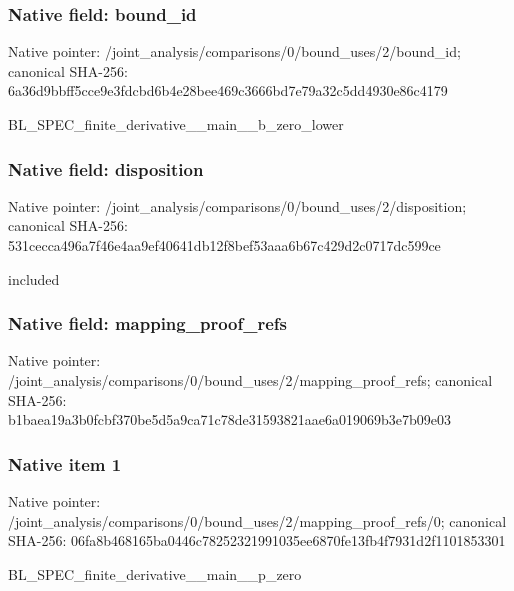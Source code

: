 \documentclass[10pt,a4paper]{article}
\begin{document}
\subsubsection{Native field: bound\_\allowbreak{}id}
Native pointer: /joint\_\allowbreak{}analysis/comparisons/0/bound\_\allowbreak{}uses/2/bound\_\allowbreak{}id; canonical SHA-256: 6a36d9bbff5cce9e3fdcbd6b4e28bee469c3666bd7e79a32c5dd4930e86c4179

\begingroup\raggedright\sloppy BL\_\allowbreak{}SPEC\_\allowbreak{}finite\_\allowbreak{}derivative\_\allowbreak{}\_\allowbreak{}main\_\allowbreak{}\_\allowbreak{}b\_\allowbreak{}zero\_\allowbreak{}lower\par\endgroup

\subsubsection{Native field: disposition}
Native pointer: /joint\_\allowbreak{}analysis/comparisons/0/bound\_\allowbreak{}uses/2/disposition; canonical SHA-256: 531cecca496a7f46e4aa9ef40641db12f8bef53aaa6b67c429d2c0717dc599ce

\begingroup\raggedright\sloppy included\par\endgroup

\subsubsection{Native field: mapping\_\allowbreak{}proof\_\allowbreak{}refs}
Native pointer: /joint\_\allowbreak{}analysis/comparisons/0/bound\_\allowbreak{}uses/2/mapping\_\allowbreak{}proof\_\allowbreak{}refs; canonical SHA-256: b1baea19a3b0fcbf370be5d5a9ca71c78de31593821aae6a019069b3e7b09e03

\subsubsection{Native item 1}
Native pointer: /joint\_\allowbreak{}analysis/comparisons/0/bound\_\allowbreak{}uses/2/mapping\_\allowbreak{}proof\_\allowbreak{}refs/0; canonical SHA-256: 06fa8b468165ba0446c78252321991035ee6870fe13fb4f7931d2f1101853301

\begingroup\raggedright\sloppy BL\_\allowbreak{}SPEC\_\allowbreak{}finite\_\allowbreak{}derivative\_\allowbreak{}\_\allowbreak{}main\_\allowbreak{}\_\allowbreak{}p\_\allowbreak{}zero\par\endgroup
\end{document}
